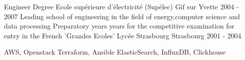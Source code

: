 \documentclass[12pt, a4paper]{awesome-cv}
\begin{document}
	\vspace{-4mm}	
	\begin{cventries}
	  \cventry
		{Engineer Degree} 
		{Ecole supérieure d’électricité (Supélec)} %
		{Gif sur Yvette} 
		{2004 - 2007} 
		{
		  Leading school of engineering in the field of energy,computer science and data processing
		}
	  \vspace{4mm}
	  \cventry
		{Preparatory years years for the competitive examination for entry in the French ’Grandes Ecoles’} 
		{Lycée Strasbourg} 
		{Strasbourg} 
		{2001 - 2004}
		{}
	\end{cventries}

	\begin{cvskills}
	   {AWS, Openstack}
	   {Terraform, Ansible}
	   {ElasticSearch, InfluxDB, Clickhouse}
	\end{cvskills}
\end{document}
